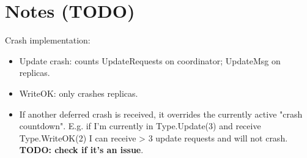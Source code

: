 \section{Notes (TODO)}

Crash implementation:

\begin{itemize}
    \item Update crash: counts UpdateRequests on coordinator; UpdateMsg on replicas.
    \item WriteOK: only crashes replicas.
    \item If another deferred crash is received, it overrides the currently active "crash countdown". E.g. if I'm currently in Type.Update(3) and receive Type.WriteOK(2) I can receive > 3 update requests and will not crash. \textbf{TODO: check if it's an issue}.
\end{itemize}

